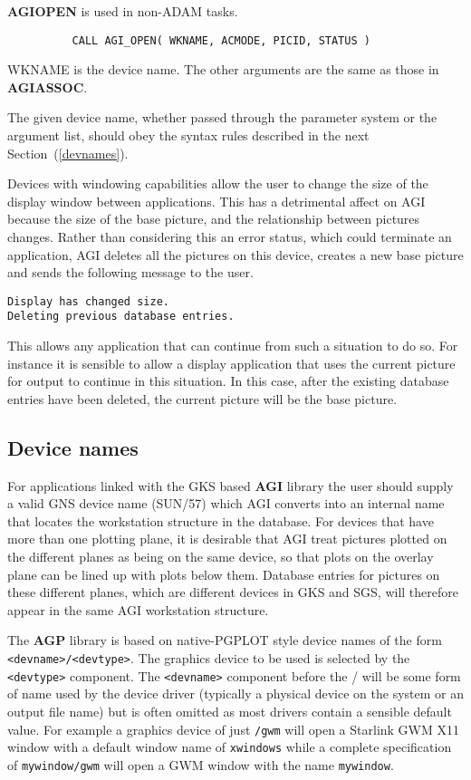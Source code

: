 \documentclass[twoside,11pt]{article}
\newcommand{\hyperref}[4]{#2\ref{#4}#3}
\newcommand{\htmlref}[2]{#1}
\newcommand{\xref}[3]{#1}
\renewcommand{\_}{\texttt{\symbol{95}}}
\begin{document}
\htmlref{{\bf AGI\_OPEN}}{AGI_OPEN} is used in non-ADAM tasks.
\begin{verbatim}
          CALL AGI_OPEN( WKNAME, ACMODE, PICID, STATUS )
\end{verbatim}
WKNAME is the device name. The other arguments are the same as those in
{\bf AGI\_ASSOC}.

The given device name, whether passed through the parameter system or the
argument list, should obey the syntax rules described
\hyperref{here}{in the next Section~(}{)}{devnames}.

Devices with windowing capabilities allow the user to change the size of the
display window between applications. This has a detrimental affect on AGI
because the size of the base picture, and the relationship between pictures
changes. Rather than considering this an error status, which could terminate
an application, AGI deletes all the pictures on this device, creates a
new base picture and sends the following message to the user.
\begin{verbatim}
Display has changed size.
Deleting previous database entries.
\end{verbatim}
This allows any application that can continue from such a situation to do so.
For instance it is sensible to allow a display application that uses the
current picture for output to continue in this situation. In this case, after
the existing database entries have been deleted, the current picture will be
the base picture.

\subsection{Device names\label{devnames}}

For applications linked with the GKS based {\bf AGI} library the user
should supply a valid GNS device name (\xref{SUN/57}{sun57}{}) which
AGI converts into an internal name that locates the workstation
structure in the database. For devices that have more than one
plotting plane, it is desirable that AGI treat pictures plotted on the
different planes as being on the same device, so that plots on the
overlay plane can be lined up with plots below them. Database entries
for pictures on these different planes, which are different devices in
GKS and SGS, will therefore appear in the same AGI workstation
structure.

The {\bf AGP} library is based on native-PGPLOT style device names of the
form {\tt <devname>/<devtype>}. The graphics device to be used is
selected by the {\tt <devtype>} component. The {\tt <devname>}
component before the \// will be some form of name used by the device
driver (typically a physical device on the system or an output file
name) but is often omitted as most drivers contain a sensible default
value. For example a graphics device of just {\tt \//gwm} will open a
Starlink GWM X11 window with a default window name of {\tt xwindows}
while a complete specification of {\tt mywindow/gwm} will open a GWM
window with the name {\tt mywindow}.
\end{document}
